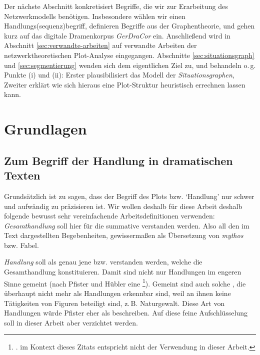 \documentclass[a4paper,10pt,abstract=true,headings=small]{scrartcl}
\begin{document}
Der nächste Abschnitt konkretisiert Begriffe, die wir zur Erarbeitung des Netzwerkmodells benötigen.
Insbesondere wählen wir einen Handlungs(sequenz)begriff, definieren Begriffe aus der Graphentheorie, und gehen kurz auf das digitale Dramenkorpus \emph{GerDraCor} ein. %
Anschließend wird in Abschnitt \ref{sec:verwandte-arbeiten} auf verwandte Arbeiten der netzwerktheoretischen Plot-Analyse eingegangen.
Abschnitte \ref{sec:situationsgraph} und \ref{sec:segmentierung} wenden sich dem eigentlichen Ziel zu, und behandeln o.\,g. Punkte (i) und (ii): Erster plausibilisiert das Modell der \emph{Situationsgraphen}, Zweiter erklärt wie sich hieraus eine Plot-Struktur heuristisch errechnen lassen kann.




\section{Grundlagen}\label{sec:grundlagen}

\subsection{Zum Begriff der Handlung in dramatischen Texten}\label{sec:handlung}

Grundsätzlich ist zu sagen, dass der Begriff des Plots bzw. \enquote*{Handlung} nur schwer und aufwändig zu präzisieren ist.\autocites[Vgl.][]{kukkonen_plot_2014}[Vgl.][]{herman_routledge_2005}
Wir wollen deshalb für diese Arbeit deshalb folgende bewusst sehr vereinfachende Arbeitsdefinitionen verwenden: \emph{Gesamthandlung} soll hier für die summative   verstanden werden.
Also all den im Text dargestellten Begebenheiten, gewissermaßen als Übersetzung von \emph{mythos} bzw. Fabel.

\emph{Handlung} soll als genau jene  bzw.  verstanden werden, welche die Gesamthandlung konstituieren.\autocite[Vgl.][5--8]{asmuth_einfuhrung_2016}
Damit sind nicht nur Handlungen im engeren Sinne gemeint (nach Pfister und Hübler eine \footnote{\cite[269]{pfister_drama:_2001}.  im Kontext dieses Zitats entspricht nicht der Verwendung in dieser Arbeit.}). Gemeint sind auch solche , die überhaupt nicht mehr als Handlungen erkennbar sind, weil an ihnen keine Tätigkeiten von Figuren beteiligt sind, z.\,B. Naturgewalt.
Diese Art von Handlungen würde Pfister eher als  beschreiben\autocite[Vgl.][270]{pfister_drama:_2001}.
Auf diese feine Aufschlüsselung soll in dieser Arbeit aber verzichtet werden.
\end{document}
